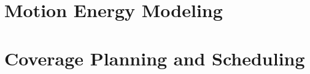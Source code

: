 
\section{Motion Energy Modeling}
\label{sec:res-ene-mot}

\section{Coverage Planning and Scheduling}
\label{sec:res-dyn}




